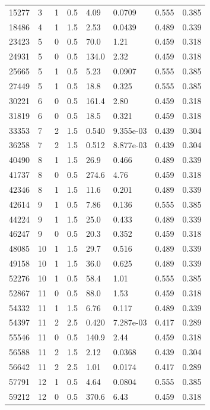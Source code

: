 \documentclass[preview]{standalone}
\begin{document}
{{\begin{tabular}{L{1.2cm}C{1.2cm} C{0.3cm}C{0.5cm} C{1.4cm}C{1.4cm} C{1.4cm}C{1.4cm}}
  15277  &     3  & 1     & 0.5 &  4.09  & 0.0709  & 0.555 &  0.385   \\ 
  18486  &     4  & 1     & 1.5 &  2.53  & 0.0439  & 0.489 &  0.339   \\ 
  23423  &     5  & 0     & 0.5 &  70.0  & 1.21  & 0.459 &  0.318   \\ 
  24931  &     5  & 0     & 0.5 &  134.0  & 2.32  & 0.459 &  0.318   \\ 
  25665  &     5  & 1     & 0.5 &  5.23  & 0.0907  & 0.555 &  0.385   \\ 
  27449  &     5  & 1     & 0.5 &  18.8  & 0.325  & 0.555 &  0.385   \\ 
  30221  &     6  & 0     & 0.5 &  161.4  & 2.80  & 0.459 &  0.318   \\ 
  31819  &     6  & 0     & 0.5 &  18.5  & 0.321  & 0.459 &  0.318   \\ 
  33353  &     7  & 2     & 1.5 &  0.540  & 9.355e-03  & 0.439 &  0.304   \\ 
  36258  &     7  & 2     & 1.5 &  0.512  & 8.877e-03  & 0.439 &  0.304   \\ 
  40490  &     8  & 1     & 1.5 &  26.9  & 0.466  & 0.489 &  0.339   \\ 
  41737  &     8  & 0     & 0.5 &  274.6  & 4.76  & 0.459 &  0.318   \\ 
  42346  &     8  & 1     & 1.5 &  11.6  & 0.201  & 0.489 &  0.339   \\ 
  42614  &     9  & 1     & 0.5 &  7.86  & 0.136  & 0.555 &  0.385   \\ 
  44224  &     9  & 1     & 1.5 &  25.0  & 0.433  & 0.489 &  0.339   \\ 
  46247  &     9  & 0     & 0.5 &  20.3  & 0.352  & 0.459 &  0.318   \\ 
  48085  &    10  & 1     & 1.5 &  29.7  & 0.516  & 0.489 &  0.339   \\ 
  49158  &    10  & 1     & 1.5 &  36.0  & 0.625  & 0.489 &  0.339   \\ 
  52276  &    10  & 1     & 0.5 &  58.4  & 1.01  & 0.555 &  0.385   \\ 
  52867  &    11  & 0     & 0.5 &  88.0  & 1.53  & 0.459 &  0.318   \\ 
  54332  &    11  & 1     & 1.5 &  6.76  & 0.117  & 0.489 &  0.339   \\ 
  54397  &    11  & 2     & 2.5 &  0.420  & 7.287e-03  & 0.417 &  0.289   \\ 
  55546  &    11  & 0     & 0.5 &  140.9  & 2.44  & 0.459 &  0.318   \\ 
  56588  &    11  & 2     & 1.5 &  2.12  & 0.0368  & 0.439 &  0.304   \\ 
  56642  &    11  & 2     & 2.5 &  1.01  & 0.0174  & 0.417 &  0.289   \\ 
  57791  &    12  & 1     & 0.5 &  4.64  & 0.0804  & 0.555 &  0.385   \\ 
  59212  &    12  & 0     & 0.5 &  370.6  & 6.43  & 0.459 &  0.318   \\ 
\hline 
\end{tabular} 

}}
\end{document}
